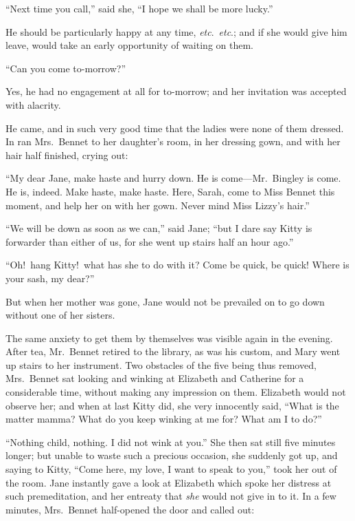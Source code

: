 \documentclass[12pt,english,oneside]{book}
\begin{document}
{}``Next time you call,'' said she, {}``I hope we shall be more
lucky.''

He should be particularly happy at any time, \textit{etc}.\ \textit{etc}.;
and if she would give him leave, would take an early opportunity of
waiting on them.

{}``Can you come to-morrow?''\ 

Yes, he had no engagement at all for to-morrow; and her invitation
was accepted with alacrity.

He came, and in such very good time that the ladies were none of them
dressed. In ran Mrs.\ Bennet to her daughter's room, in her dressing
gown, and with her hair half finished, crying out:

{}``My dear Jane, make haste and hurry down. He is come\mbox{---}Mr.\ Bingley
is come. He is, indeed. Make haste, make haste. Here, Sarah, come
to Miss Bennet this moment, and help her on with her gown. Never mind
Miss Lizzy's hair.''

{}``We will be down as soon as we can,'' said Jane; {}``but I dare
say Kitty is forwarder than either of us, for she went up stairs half
an hour ago.''

{}``Oh!\ hang Kitty!\ what has she to do with it? Come be quick,
be quick! Where is your sash, my dear?''\ 

But when her mother was gone, Jane would not be prevailed on to go
down without one of her sisters.

The same anxiety to get them by themselves was visible again in the
evening. After tea, Mr.\ Bennet retired to the library, as was his
custom, and Mary went up stairs to her instrument. Two obstacles of
the five being thus removed, Mrs.\ Bennet sat looking and winking
at Elizabeth and Catherine for a considerable time, without making
any impression on them. Elizabeth would not observe her; and when
at last Kitty did, she very innocently said, {}``What is the matter
mamma? What do you keep winking at me for? What am I to do?''\ 

{}``Nothing child, nothing. I did not wink at you.'' She then sat
still five minutes longer; but unable to waste such a precious occasion,
she suddenly got up, and saying to Kitty, {}``Come here, my love,
I want to speak to you,'' took her out of the room. Jane instantly
gave a look at Elizabeth which spoke her distress at such premeditation,
and her entreaty that \textit{she} would not give in to it. In a few
minutes, Mrs.\ Bennet half-opened the door and called out:
\end{document}
